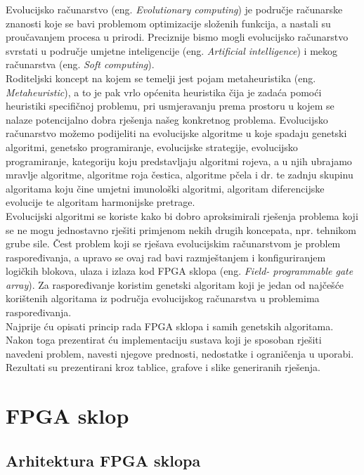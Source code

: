 \documentclass[times, utf8, zavrsni]{fer}
\begin{document}
	Evolucijsko računarstvo (eng. \emph{Evolutionary computing}) je područje računarske znanosti koje se bavi problemom optimizacije složenih funkcija, a nastali su proučavanjem procesa u prirodi. Preciznije bismo mogli evolucijsko računarstvo svrstati u područje umjetne inteligencije (eng. \emph{Artificial intelligence}) i mekog računarstva (eng. \emph{Soft computing}).\\Roditeljski koncept na kojem se temelji jest pojam metaheuristika (eng. \emph{Metaheuristic}), a to je pak vrlo općenita heuristika čija je zadaća pomoći heuristiki specifičnoj problemu, pri usmjeravanju prema prostoru u kojem se nalaze potencijalno dobra rješenja našeg konkretnog problema. Evolucijsko računarstvo možemo podijeliti na evolucijske algoritme u koje spadaju genetski algoritmi, genetsko programiranje, evolucijske strategije, evolucijsko programiranje, kategoriju koju predstavljaju algoritmi rojeva, a u njih ubrajamo mravlje algoritme, algoritme roja čestica, algoritme pčela i dr. te zadnju skupinu algoritama koju čine umjetni imunološki algoritmi, algoritam diferencijske evolucije te algoritam harmonijske pretrage.\\
	Evolucijski algoritmi se koriste kako bi dobro aproksimirali rješenja problema koji se ne mogu jednostavno rješiti primjenom nekih drugih koncepata, npr. tehnikom grube sile. Čest problem koji se rješava evolucijskim računarstvom je problem raspoređivanja, a upravo se ovaj rad bavi razmještanjem i konfiguriranjem logičkih blokova, ulaza i izlaza kod FPGA sklopa (eng. \emph{Field- programmable gate array}). Za raspoređivanje koristim genetski algoritam koji je jedan od najčešće korištenih algoritama iz područja evolucijskog računarstva u problemima raspoređivanja.\\
	Najprije ću opisati princip rada FPGA sklopa i samih genetskih algoritama. Nakon toga prezentirat ću implementaciju sustava koji je sposoban rješiti navedeni problem, navesti njegove prednosti, nedostatke i ograničenja u uporabi. Rezultati su prezentirani kroz tablice, grafove i slike generiranih rješenja. 
	
	\section{FPGA sklop}
	
	\subsection{Arhitektura FPGA sklopa}
	
\end{document}

